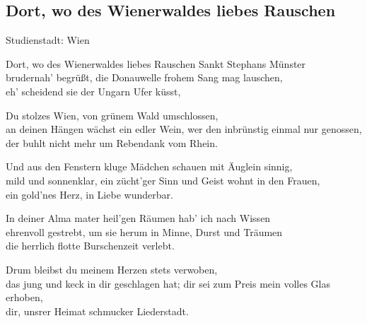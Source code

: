 
\subsection*{Dort, wo des Wienerwaldes liebes Rauschen}
%
%

\hfill%
Studienstadt: Wien\\

\thestrophe Dort, wo des Wienerwaldes liebes Rauschen Sankt Stephans Münster \\
brudernah' begrüßt, die Donauwelle frohem Sang mag lauschen, \\
eh' scheidend sie der Ungarn Ufer küsst, 

\thestrophe Du stolzes Wien, von grünem Wald umschlossen, \\
an deinen Hängen wächst ein edler Wein, wer den inbrünstig einmal nur genossen, \\
der buhlt nicht mehr um Rebendank vom Rhein. 

\thestrophe Und aus den Fenstern kluge Mädchen schauen mit Äuglein sinnig, \\
mild und sonnenklar, ein zücht'ger Sinn und Geist wohnt in den Frauen, \\
ein gold'nes Herz, in Liebe wunderbar. 

\thestrophe In deiner Alma mater heil'gen Räumen hab' ich nach Wissen \\
ehrenvoll gestrebt, um sie herum in Minne, Durst und Träumen \\
die herrlich flotte Burschenzeit verlebt. 

\thestrophe Drum bleibst du meinem Herzen stets verwoben, \\
das jung und keck in dir geschlagen hat; dir sei zum Preis mein volles Glas erhoben, \\
dir, unsrer Heimat schmucker Liederstadt. 
